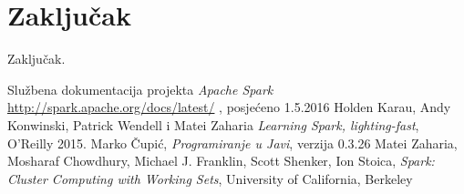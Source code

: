 \documentclass[times, utf8, zavrsni, numeric]{fer}
\begin{document}
\chapter{Zaključak} 
Zaključak.


\begin{thebibliography}{9}
  Službena dokumentacija projekta \emph{Apache Spark} \url{http://spark.apache.org/docs/latest/} , posjećeno 1.5.2016
  Holden Karau, Andy Konwinski, Patrick Wendell i Matei Zaharia
  \emph{Learning Spark, lighting-fast}, O'Reilly 2015.
  Marko Čupić,
  \emph{Programiranje u Javi},
  verzija 0.3.26
  Matei Zaharia, Mosharaf Chowdhury, Michael J. Franklin, Scott Shenker, Ion Stoica,
  \emph{Spark: Cluster Computing with Working Sets}, University of California, Berkeley
\end{thebibliography}
\end{document}
